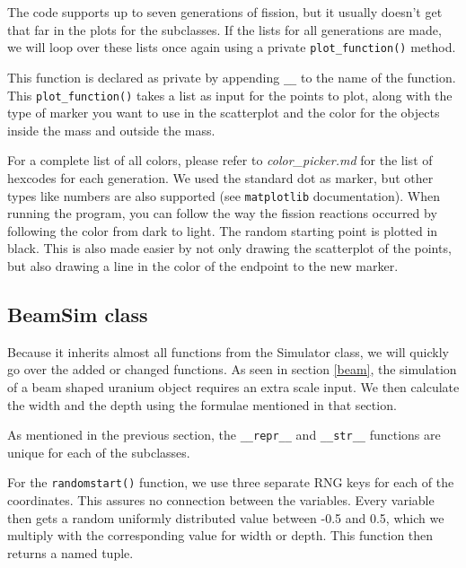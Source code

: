 The code supports up to seven generations of fission, but it usually doesn't get that far in the plots for the subclasses. If the lists for all generations are made, we will loop over these lists once again using a private \lstinline[language=PythonPlus, style=colorEX]|plot_function()| method. 

This function is declared as private by appending \lstinline[language=PythonPlus, style=colorEX]|__| to the name of the function. This \lstinline[language=PythonPlus, style=colorEX]|plot_function()| takes a list as input for the points to plot, along with the type of marker you want to use in the scatterplot and the color for the objects inside the mass and outside the mass. 

For a complete list of all colors, please refer to \textit{color\_picker.md} for the list of hexcodes for each generation. We used the standard dot as marker, but other types like numbers are also supported (see \lstinline[language=PythonPlus, style=colorEX]|matplotlib| documentation). When running the program, you can follow the way the fission reactions occurred by following the color from dark to light. The random starting point is plotted in black. This is also made easier by not only drawing the scatterplot of the points, but also drawing a line in the color of the endpoint to the new marker.

\subsection{BeamSim class}
Because it inherits almost all functions from the Simulator class, we will quickly go over the added or changed functions. As seen in section \ref{beam}, the simulation of a beam shaped uranium object requires an extra scale input. We then calculate the width and the depth using the formulae mentioned in that section.

As mentioned in the previous section, the \lstinline[language=PythonPlus, style=colorEX]|__repr__| and \lstinline[language=PythonPlus, style=colorEX]|__str__| functions are unique for each of the subclasses.

For the \lstinline[language=PythonPlus, style=colorEX]|randomstart()| function, we use three separate RNG keys for each of the coordinates. This assures no connection between the variables. Every variable then gets a random uniformly distributed value between -0.5 and 0.5, which we multiply with the corresponding value for width or depth. This function then returns a named tuple.


